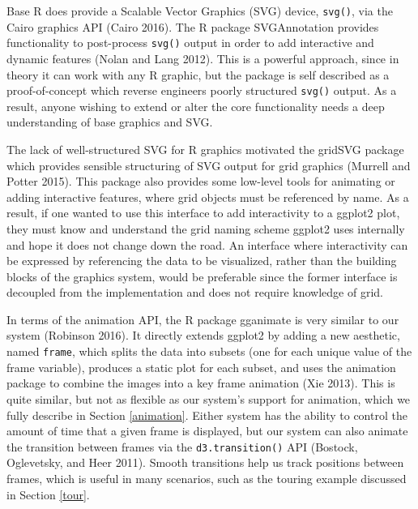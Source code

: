 \documentclass[12pt,]{article}
\theoremstyle{definition}
\theoremstyle{definition}
\theoremstyle{remark}
\begin{document}
Base R does provide a Scalable Vector Graphics (SVG) device,
\texttt{svg()}, via the Cairo graphics API (Cairo 2016). The R package
SVGAnnotation provides functionality to post-process \texttt{svg()}
output in order to add interactive and dynamic features (Nolan and Lang
2012). This is a powerful approach, since in theory it can work with any
R graphic, but the package is self described as a proof-of-concept which
reverse engineers poorly structured \texttt{svg()} output. As a result,
anyone wishing to extend or alter the core functionality needs a deep
understanding of base graphics and SVG.

The lack of well-structured SVG for R graphics motivated the gridSVG
package which provides sensible structuring of SVG output for grid
graphics (Murrell and Potter 2015). This package also provides some
low-level tools for animating or adding interactive features, where grid
objects must be referenced by name. As a result, if one wanted to use
this interface to add interactivity to a ggplot2 plot, they must know
and understand the grid naming scheme ggplot2 uses internally and hope
it does not change down the road. An interface where interactivity can
be expressed by referencing the data to be visualized, rather than the
building blocks of the graphics system, would be preferable since the
former interface is decoupled from the implementation and does not
require knowledge of grid.

In terms of the animation API, the R package gganimate is very similar
to our system (Robinson 2016). It directly extends ggplot2 by adding a
new aesthetic, named \texttt{frame}, which splits the data into subsets
(one for each unique value of the frame variable), produces a static
plot for each subset, and uses the animation package to combine the
images into a key frame animation (Xie 2013). This is quite similar, but
not as flexible as our system's support for animation, which we fully
describe in Section \ref{animation}. Either system has the ability to
control the amount of time that a given frame is displayed, but our
system can also animate the transition between frames via the
\texttt{d3.transition()} API (Bostock, Oglevetsky, and Heer 2011).
Smooth transitions help us track positions between frames, which is
useful in many scenarios, such as the touring example discussed in
Section \ref{tour}.
\end{document}

